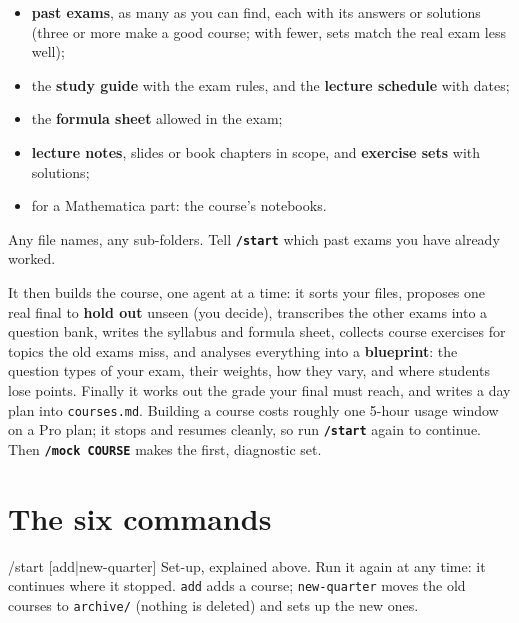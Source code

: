 \documentclass[a4paper,10pt]{article}
\newcommand{\cmd}[1]{\texttt{\bfseries #1}}
\newcommand{\argx}[1]{\texttt{\color{accent}#1}}
\begin{document}
\begin{note}
\begin{itemize}
  \item \textbf{past exams}, as many as you can find, each with its answers or solutions
    (three or more make a good course; with fewer, sets match the real exam less well);
  \item the \textbf{study guide} with the exam rules, and the \textbf{lecture schedule} with dates;
  \item the \textbf{formula sheet} allowed in the exam;
  \item \textbf{lecture notes}, slides or book chapters in scope, and \textbf{exercise sets} with solutions;
  \item for a Mathematica part: the course's notebooks.
\end{itemize}
Any file names, any sub-folders. Tell \cmd{/start} which past exams you have already worked.
\end{note}

It then builds the course, one agent at a time: it sorts your files, proposes one real
final to \textbf{hold out} unseen (you decide), transcribes the other exams into a question
bank, writes the syllabus and formula sheet, collects course exercises for topics the old
exams miss, and analyses everything into a \textbf{blueprint}: the question types of your
exam, their weights, how they vary, and where students lose points. Finally it works out
the grade your final must reach, and writes a day plan into \texttt{courses.md}. Building a
course costs roughly one 5-hour usage window on a Pro plan; it stops and resumes cleanly,
so run \cmd{/start} again to continue. Then \cmd{/mock COURSE} makes the first, diagnostic set.

\section{The six commands}

\begin{card}{/start [add|new-quarter]}
Set-up, explained above. Run it again at any time: it continues where it stopped.
\argx{add} adds a course; \argx{new-quarter} moves the old courses to \texttt{archive/} (nothing is
deleted) and sets up the new ones.
\end{card}
\end{document}
